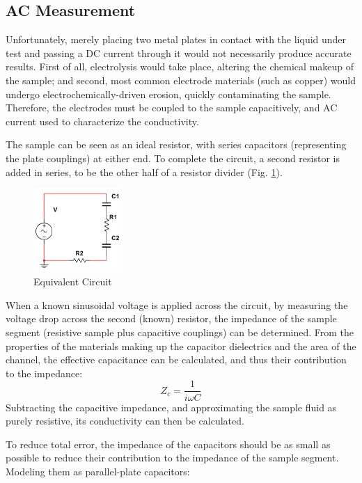 \documentclass[]{article}
\begin{document}
\subsection{AC Measurement}
\par Unfortunately, merely placing two metal plates in contact with the liquid under test and passing a DC current through it would not necessarily produce accurate results. First of all, electrolysis would take place, altering the chemical makeup of the sample; and second, most common electrode materials (such as copper) would undergo electrochemically-driven erosion, quickly contaminating the sample. Therefore, the electrodes must be coupled to the sample capacitively, and AC current used to characterize the conductivity. 
\par The sample can be seen as an ideal resistor, with series capacitors (representing the plate couplings) at either end. To complete the circuit, a second resistor is added in series, to be the other half of a resistor divider (Fig. \ref{fig:equivalent_circuit}).
\begin{figure}[h!]
	\centering
	\includegraphics[width=0.3\textwidth]{Conductivity_Equivalent_Circuit}
	\caption{Equivalent Circuit}
	\label{fig:equivalent_circuit}
\end{figure}
When a known sinusoidal voltage is applied across the circuit, by measuring the voltage drop across the second (known) resistor, the impedance of the sample segment (resistive sample plus capacitive couplings) can be determined. From the properties of the materials making up the capacitor dielectrics and the area of the channel, the effective capacitance can be calculated, and thus their contribution to the impedance:
\begin{equation}
Z_c=\frac{1}{i\omega C}
\end{equation}
Subtracting the capacitive impedance, and approximating the sample fluid as purely resistive, its conductivity can then be calculated.
 \par To reduce total error, the impedance of the capacitors should be as small as possible to reduce their contribution to the impedance of the sample segment. Modeling them as parallel-plate capacitors:
\end{document}
